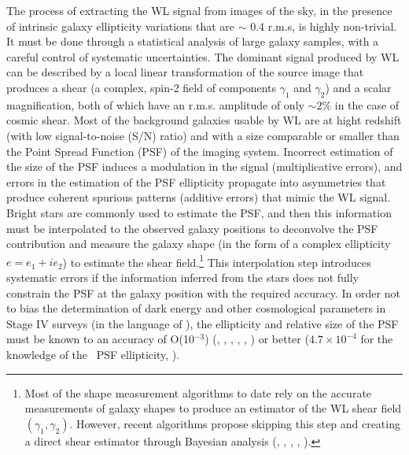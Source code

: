 \documentclass[preprint]{aastex}
\begin{document}
The process of extracting the WL signal from images of the sky, in the presence of intrinsic galaxy ellipticity variations that are $\sim$ 0.4 r.m.s, is highly non-trivial. It must be done through a statistical analysis of large galaxy samples, with a careful control of systematic uncertainties. The dominant signal produced by WL can be described by a local linear transformation of the source image that produces a shear (a complex, spin-2 field of components $\gamma_1$ and $\gamma_2$) and a scalar magnification, both of which have an r.m.s. amplitude of only $\sim 2 \%$ in the case of cosmic shear. Most of the background galaxies usable by WL are at hight redshift (with low signal-to-noise (S/N) ratio) and with a size comparable or smaller than the Point Spread Function (PSF) of the imaging system. Incorrect estimation of the size of the PSF induces a modulation in the signal (multiplicative errors), and errors in the estimation of the PSF ellipticity propagate into asymmetries that produce coherent spurious patterns (additive errors) that mimic the WL signal. Bright stars are commonly used to estimate the PSF, and then this information must be interpolated to the observed galaxy positions to deconvolve the PSF contribution and measure the galaxy shape (in the form of a complex ellipticity $e=e_1 + i e_2$) to estimate the shear field.\footnote{Most of the shape measurement algorithms to date rely on the accurate measurements of galaxy shapes to produce an estimator of the WL shear field $(\gamma_1, \gamma_2)$. However, recent algorithms propose skipping this step and creating a direct shear estimator through Bayesian analysis (\citealt{miller13}, \citealt{bernstein14}, \citealt{bernstein15}, \citealt{schneider15}, \citealt{alsing16}).} This interpolation step introduces systematic errors if the information inferred from the stars does not fully constrain the PSF at the galaxy position with the required accuracy. In order not to bias the determination of dark energy and other cosmological parameters in Stage IV surveys (in the language of \citealt{albrecht06}), the ellipticity and relative size of the PSF must be known to an accuracy of O(10$^{-3}$) (\citealt{huterer06}, \citealt{amara08}, \citealt{paulin08}, \citealt{paulin09}, \citealt{massey13}, \citealt{cropper13}) or better ($4.7 \times 10^{-4}$ for the knowledge of the \wfa\ PSF ellipticity, \citealt{spergel13}).

\end{document}
